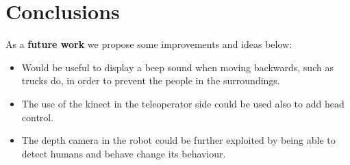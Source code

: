 \section{Conclusions}
\label{sec:conclusions}


As a \textbf{future work} we propose some improvements and ideas below:

\begin{itemize}
	\item Would be useful to display a beep sound when moving backwards, such as trucks do, in order to prevent the people in the surroundings.
	\item The use of the kinect in the teleoperator side could be used also to add head control.
	\item The depth camera in the robot could be further exploited by being able to detect humans and behave change its behaviour.
\end{itemize}
